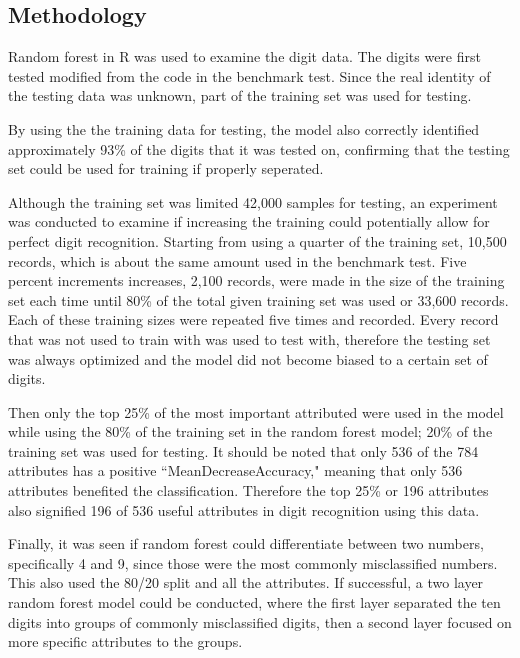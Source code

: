 \documentclass[a4paper]{article}
\begin{document}
\begin{doublespace}
\section{Methodology}

Random forest in R was used to examine the digit data. The digits were first tested modified from the code in the benchmark test. Since the real identity of the testing data was unknown, part of the training set was used for testing. 



By using the the training data for testing, the model also correctly identified approximately 93\% of the digits that it was tested on, confirming that the testing set could be used for training if properly seperated.

Although the training set was limited 42,000 samples for testing, an experiment was conducted to examine if increasing the training could potentially allow for perfect digit recognition. Starting from using a quarter of the training set, 10,500 records, which is about the same amount used in the benchmark test. Five percent increments increases, 2,100 records, were made in the size of the training set each time until 80\% of the total given training set was used or 33,600 records. Each of these training sizes were repeated five times and recorded. Every record that was not used to train with was used to test with, therefore the testing set was always optimized and the model did not become biased to a certain set of digits.


 
Then only the top 25\% of the most important attributed were used in the model while using the 80\% of the training set in the random forest model; 20\% of the training set was used for testing. It should be noted that only 536 of the 784 attributes has a positive ``MeanDecreaseAccuracy," meaning that only 536 attributes benefited the classification. Therefore the top 25\% or 196 attributes also signified 196 of 536 useful attributes in digit recognition using this data. 



Finally, it was seen if random forest could differentiate between two numbers, specifically 4 and 9, since those were the most commonly misclassified numbers. This also used the 80/20 split and all the attributes. If successful, a two layer random forest model could be conducted, where the first layer separated the ten digits into groups of commonly misclassified digits, then a second layer focused on more specific attributes to the groups.


\end{doublespace}
\end{document}

